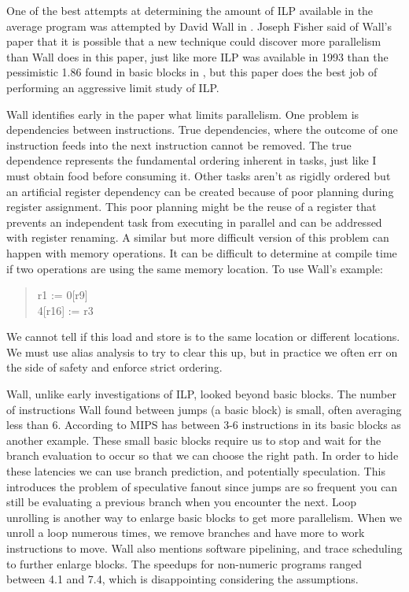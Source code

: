 \documentclass[12pt,twoside,letterpaper]{article}
\begin{document}
One of the best attempts at determining the amount of ILP available in the average program was attempted by David Wall in \cite{Wall:1991p191}. Joseph Fisher said of Wall's paper \cite{Rau:1992p211} that it is possible that a new technique could discover more parallelism than Wall does in this paper, just like more ILP was available in 1993 than the pessimistic 1.86 found in basic blocks in \cite{Tjaden:1970p214}, but this paper does the best job of performing an aggressive limit study of ILP.

Wall identifies early in the paper what limits parallelism. One problem is dependencies between instructions. True dependencies, where the outcome of one instruction feeds into the next instruction cannot be removed. The true dependence represents the fundamental ordering inherent in tasks, just like I must obtain food before consuming it. Other tasks aren't as rigidly ordered but an artificial register dependency can be created because of poor planning during register assignment. This poor planning might be the reuse of a register that prevents an independent task from executing in parallel and can be addressed with register renaming. A similar but more difficult version of this problem can happen with memory operations. It can be difficult to determine at compile time if two operations are using the same memory location. To use Wall’s example:

\begin{quote}
r1 := 0[r9] \\
4[r16] := r3
\end{quote}

We cannot tell if this load and store is to the same location or different locations. We must use alias analysis to try to clear this up, but in practice we often err on the side of safety and enforce strict ordering.

Wall, unlike early investigations of ILP, looked beyond basic blocks. The number of instructions Wall found between jumps (a basic block) is small, often averaging less than 6. According to \cite{Hennessy:2003p277} MIPS has between 3-6 instructions in its basic blocks as another example. These small basic blocks require us to stop and wait for the branch evaluation to occur so that we can choose the right path. In order to hide these latencies we can use branch prediction, and potentially speculation. This introduces the problem of speculative fanout since jumps are so frequent you can still be evaluating a previous branch when you encounter the next. Loop unrolling is another way to enlarge basic blocks to get more parallelism. When we unroll a loop numerous times, we remove branches and have more to work instructions to move. Wall also mentions software pipelining, and trace scheduling to further enlarge blocks. The speedups for non-numeric programs ranged between 4.1 and 7.4, which is disappointing considering the assumptions.
\end{document}
